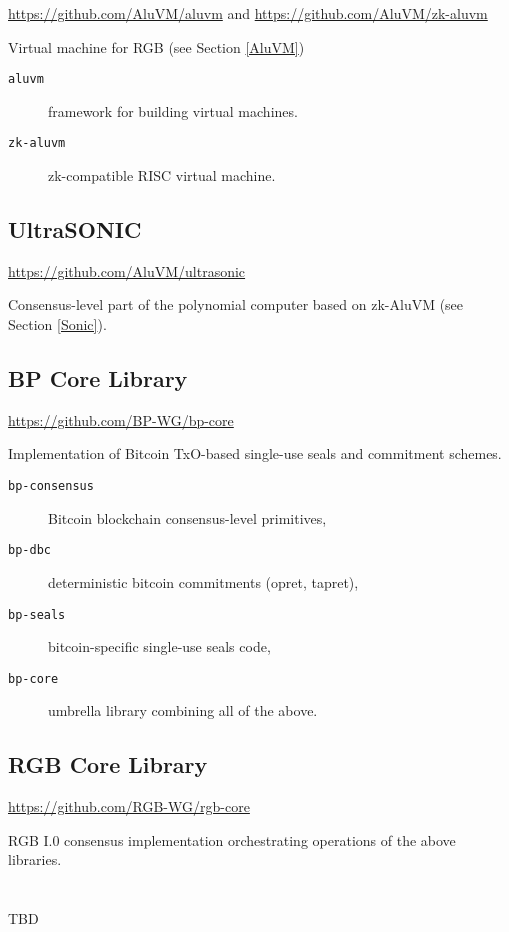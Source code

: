 \documentclass[9pt,oneside]{amsart}
\begin{document}
\url{https://github.com/AluVM/aluvm} and \url{https://github.com/AluVM/zk-aluvm}

Virtual machine for RGB (see Section \ref{AluVM})

\begin{description}
    \item[\texttt{aluvm}] framework for building virtual machines.
    \item[\texttt{zk-aluvm}] zk-compatible RISC virtual machine.
\end{description}

\subsection{UltraSONIC}

\url{https://github.com/AluVM/ultrasonic}

Consensus-level part of the polynomial computer based on zk-AluVM (see Section \ref{Sonic}).

\subsection{BP Core Library}

\url{https://github.com/BP-WG/bp-core}

Implementation of Bitcoin TxO-based single-use seals and commitment schemes.

\begin{description}
    \item[\texttt{bp-consensus}]  Bitcoin blockchain consensus-level primitives,
    \item[\texttt{bp-dbc}] deterministic bitcoin commitments (opret, tapret),
    \item[\texttt{bp-seals}] bitcoin-specific single-use seals code,
    \item[\texttt{bp-core}] umbrella library combining all of the above.
\end{description}

\subsection{RGB Core Library}

\url{https://github.com/RGB-WG/rgb-core}

RGB I.0 consensus implementation orchestrating operations of the above libraries.


\newpage
\section{}\label{AnnexD}
\printglossaries

TBD
\end{document}
